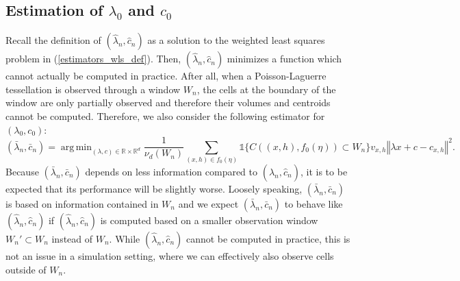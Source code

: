 \documentclass{article}
\newcommand{\RR}{\mathbb{R}}
\DeclareMathOperator*{\argmin}{arg\,min}
\theoremstyle{plain}
\theoremstyle{remark}
\theoremstyle{definition}
\begin{document}
\subsection{Estimation of \texorpdfstring{$\lambda_0$}{λ₀} and \texorpdfstring{$c_0$}{c₀}}
Recall the definition of $(\hat{\lambda}_n,\hat{c}_n)$ as a solution to the weighted least squares problem in (\ref{estimators_wls_def}). Then, $(\hat{\lambda}_n,\hat{c}_n)$ minimizes a function which cannot actually be computed in practice. After all, when a Poisson-Laguerre tessellation is observed through a window $W_n$, the cells at the boundary of the window are only partially observed and therefore their volumes and centroids cannot be computed. Therefore, we also consider the following estimator for $(\lambda_0,c_0)$:
\[(\bar{\lambda}_n, \bar{c}_n) = \argmin_{(\lambda, c)\in \RR\times\RR^d}\frac{1}{\nu_d(W_n)}\sum_{(x,h) \in f_0(\eta)}\mathds{1}{\{C((x,h),f_0(\eta)) \subset W_n\}}v_{x,h}\left\Vert \lambda x + c - c_{x,h} \right\Vert^2.\]
Because $(\bar{\lambda}_n, \bar{c}_n)$ depends on less information compared to $(\hat{\lambda}_n,\hat{c}_n)$, it is to be expected that its performance will be slightly worse. Loosely speaking, $(\bar{\lambda}_n, \bar{c}_n)$ is based on information contained in $W_n$ and we expect $(\bar{\lambda}_n, \bar{c}_n)$ to behave like $(\hat{\lambda}_n,\hat{c}_n)$ if $(\hat{\lambda}_n,\hat{c}_n)$ is computed based on a smaller observation window $W_n' \subset W_n$ instead of $W_n$. While $(\hat{\lambda}_n,\hat{c}_n)$ cannot be computed in practice, this is not an issue in a simulation setting, where we can effectively also observe cells outside of $W_n$.
\end{document}
